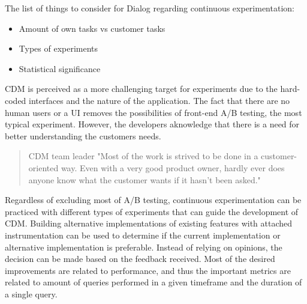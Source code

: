 \documentclass[english]{tktltiki2}
\theoremstyle{definition}
\theoremstyle{remark}
\begin{document}
The list of things to consider for Dialog regarding continuous experimentation:
\begin{itemize}
\item  Amount of own tasks vs customer tasks
\item  Types of experiments
\item  Statistical significance
\end{itemize}







CDM is perceived as a more challenging target for experiments due to the hard-coded interfaces and the nature of the application. The fact that there are no human users or a UI removes the possibilities of front-end A/B testing, the most typical experiment. However, the developers aknowledge that there is a need for better understanding the customers needs.
\begin{quote}{CDM team leader}
"Most of the work is strived to be done in a customer-oriented way. Even with a very good product owner, hardly ever does anyone know what the customer wants if it hasn't been asked."
\end{quote}
Regardless of excluding most of A/B testing, continuous experimentation can be practiced with different types of experiments that can guide the development of CDM. Building alternative implementations of existing features with attached instrumentation can be used to determine if the current implementation or alternative implementation is preferable. Instead of relying on opinions, the decision can be made based on the feedback received. Most of the desired improvements are related to performance, and thus the important metrics are related to amount of queries performed in a given timeframe and the duration of a single query.
\end{document}
